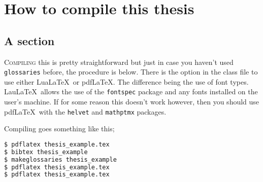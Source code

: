 
\chapter{How to compile this thesis}
\section{A section}

\lettrine{C}{ompiling} this is pretty straightforward but just in case you haven't used \texttt{glossaries} before, the procedure is below. There is the option in the class file to use either Lua\LaTeX\ or pdf\LaTeX. The difference being the use of font types. Lau\LaTeX\ allows the use of the \texttt{fontspec} package and any fonts installed on the user's machine. If for some reason this doesn't work however, then you should use pdf\LaTeX\ with the \texttt{helvet} and \texttt{mathptmx} packages.
\par
Compiling goes something like this;
\begin{lstlisting}[language=bash, caption=How to compile this example]
$ pdflatex thesis_example.tex
$ bibtex thesis_example
$ makeglossaries thesis_example
$ pdflatex thesis_example.tex
$ pdflatex thesis_example.tex
\end{lstlisting}

